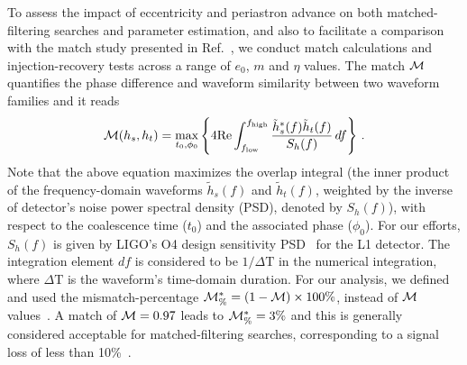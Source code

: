 \documentclass[aps,prd,twocolumn,superscriptaddress,groupedaddress,nofootinbib,showpacs,eqsecnum,useAms]{revtex4-2}
\begin{document}
To assess the impact of eccentricity and periastron advance on both matched-filtering searches and parameter estimation, and also to facilitate a comparison with the match study presented in Ref.~\cite{TGHH}, we conduct match calculations and injection-recovery tests across a range of $e_0$, $m$ and $\eta$ values. The match  ${\cal M} $ quantifies the phase difference and waveform similarity between two waveform families and it reads~\cite{Damour1998}
\begin{equation}
{\cal M}(h_s, h_t) = \max_{t_0, \phi_0} \left\{ 4 \text{Re} \int_{f_{\text{low}}}^{f_{\text{high}}} \frac{\tilde{h}_s^*(f) \tilde{h}_t(f)}{S_h(f)} \, df \right\} \,.
\label{eq:match_computation}
\end{equation}
Note that the above equation 
maximizes the overlap integral (the inner product of the frequency-domain waveforms $\tilde{h}_s(f)$ and $\tilde{h}_t(f)$, weighted by the inverse of detector's noise power spectral density (PSD), denoted by $S_h(f)$), with respect to the coalescence time ($t_0$) and the associated phase ($\phi_0$). 
For our efforts, $S_h(f)$ is given by   LIGO's O4 design sensitivity PSD~\cite{LIGO-T2000012} for the L1 detector.
The integration element $df$ is considered to be $1/\Delta \text{T}$ in the numerical integration, where $\Delta\text{T}$ is the waveform's time-domain duration. 
For our analysis, we defined and used the mismatch-percentage ${\cal M}^*_\% = (1-{\cal M}) \times 100\%$, instead of ${\cal M}$ values~\cite{Khan2019, Wang2021}.
A match of ${\cal M}=0.97$ leads to  ${\cal M}^*_\% =3\%$ and this is generally considered acceptable for matched-filtering searches, corresponding to a signal loss of less than 10\%~\cite{Damour1998}.
\end{document}

